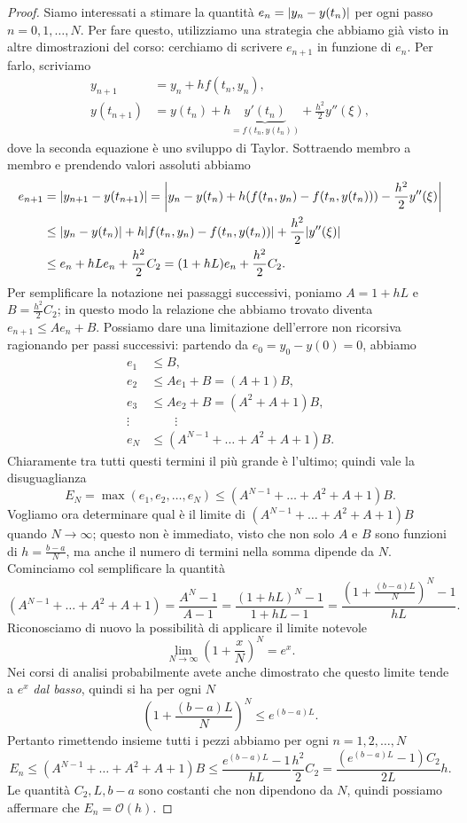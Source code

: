 \documentclass[a4paper]{report}
\DeclarePairedDelimiter{\abs}{\lvert}{\rvert}
\theoremstyle{definiton}
\theoremstyle{remark}
\begin{document}
\begin{proof}
Siamo interessati a stimare la quantità $e_n = \abs{y_n - y(t_n)}$ per ogni passo $n=0,1,\dots,N$. Per fare questo, utilizziamo una strategia che abbiamo già visto in altre dimostrazioni del corso: cerchiamo di scrivere $e_{n+1}$ in funzione di $e_n$. Per farlo, scriviamo
\begin{align*}
y_{n+1} &= y_n + h f(t_n, y_n),\\
y(t_{n+1}) &= y(t_n) + h \underbrace{y'(t_n)}_{=f(t_n,y(t_n))} + \frac{h^2}{2} y''(\xi),
\end{align*}
dove la seconda equazione è uno sviluppo di Taylor. Sottraendo membro a membro e prendendo valori assoluti abbiamo
\begin{align*}
    e_{n+1} &= \abs*{y_{n+1} - y(t_{n+1})} = \abs*{y_n - y(t_n) + h(f(t_n,y_n) - f(t_n,y(t_n))) - \frac{h^2}{2} y''(\xi)}\\
            & \leq \abs*{y_n - y(t_n)} + h \abs*{f(t_n,y_n) - f(t_n,y(t_n))} + \frac{h^2}{2} \abs*{y''(\xi)}\\
            & \leq e_n + hL e_n + \frac{h^2}{2}C_2 = (1+hL) e_n + \frac{h^2}{2}C_2.
\end{align*}
Per semplificare la notazione nei passaggi successivi, poniamo $A = 1+hL$ e $B = \frac{h^2}{2}C_2$; in questo modo la relazione che abbiamo trovato diventa $e_{n+1} \leq A e_n + B$. Possiamo dare una limitazione dell'errore non ricorsiva ragionando per passi successivi: partendo da $e_0 = y_0 - y(0) = 0$, abbiamo
\begin{align*}
    e_1 &\leq B,\\
    e_2 &\leq Ae_1 + B = (A + 1)B,\\    
    e_3 &\leq Ae_2 + B = (A^2 + A +1)B,\\
    \vdots & \quad\quad\vdots\\
    e_N &\leq (A^{N-1}+ \dots + A^2 + A + 1)B.
\end{align*}
Chiaramente tra tutti questi termini il più grande è l'ultimo; quindi vale la disuguaglianza
\[
E_N = \max(e_1,e_2,\dots,e_N) \leq (A^{N-1}+ \dots + A^2 + A + 1)B.
\]
Vogliamo ora determinare qual è il limite di $(A^{N-1}+ \dots + A^2 + A + 1)B$ quando $N\to\infty$; questo non è immediato, visto che non solo $A$ e $B$ sono funzioni di $h = \frac{b-a}{N}$, ma anche il numero di termini nella somma dipende da $N$. Cominciamo col semplificare la quantità
\[
    (A^{N-1}+ \dots + A^2 + A + 1) = \frac{A^N-1}{A-1} = \frac{(1+hL)^N-1}{1+hL-1} = \frac{\left(1+\frac{(b-a)L}{N}\right)^N-1}{hL}.
\]
Riconosciamo di nuovo la possibilità di applicare il limite notevole
\[
    \lim_{N\to \infty} \left(1+\frac{x}{N}\right)^N = e^{x}.
\]
Nei corsi di analisi probabilmente avete anche dimostrato che questo limite tende a $e^{x}$ \emph{dal basso}, quindi si ha per ogni $N$
\[
    \left(1+\frac{(b-a)L}{N}\right)^N \leq e^{(b-a)L}.
\]
Pertanto rimettendo insieme tutti i pezzi abbiamo per ogni $n=1,2,\dots,N$
\[
E_n \leq (A^{N-1}+ \dots + A^2 + A + 1)B \leq \frac{e^{(b-a)L}-1}{hL} \frac{h^2}{2}C_2 = \frac{(e^{(b-a)L}-1) C_2}{2L} h.
\]
Le quantità $C_2, L, b-a$ sono costanti che non dipendono da $N$, quindi possiamo affermare che $E_n = \mathcal{O}(h)$.
\end{proof}
\end{document}
